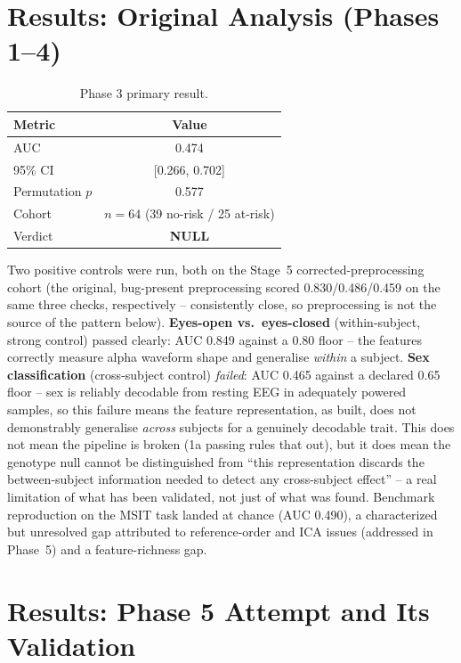 \documentclass[11pt]{article}
\begin{document}
\section{Results: Original Analysis (Phases 1--4)}

\begin{table}[h]
\centering
\caption{Phase 3 primary result.}
\begin{tabular}{lc}
\toprule
Metric & Value \\
\midrule
AUC & 0.474 \\
95\% CI & [0.266, 0.702] \\
Permutation $p$ & 0.577 \\
Cohort & $n=64$ (39 no-risk / 25 at-risk) \\
Verdict & \textbf{NULL} \\
\bottomrule
\end{tabular}
\end{table}

Two positive controls were run, both on the Stage~5 corrected-preprocessing
cohort (the original, bug-present preprocessing scored 0.830/0.486/0.459 on
the same three checks, respectively -- consistently close, so preprocessing
is not the source of the pattern below). \textbf{Eyes-open vs.\
eyes-closed} (within-subject, strong control) passed clearly: AUC 0.849
against a 0.80 floor -- the features correctly measure alpha waveform
shape and generalise \emph{within} a subject. \textbf{Sex classification}
(cross-subject control) \emph{failed}: AUC 0.465 against a declared 0.65
floor -- sex is reliably decodable from resting EEG in adequately powered
samples, so this failure means the feature representation, as built, does
not demonstrably generalise \emph{across} subjects for a genuinely
decodable trait. This does not mean the pipeline is broken (1a passing
rules that out), but it does mean the genotype null cannot be
distinguished from ``this representation discards the between-subject
information needed to detect any cross-subject effect'' -- a real
limitation of what has been validated, not just of what was found.
Benchmark reproduction on the MSIT task landed at chance (AUC 0.490), a
characterized but unresolved gap attributed to reference-order and ICA
issues (addressed in Phase~5) and a feature-richness gap.

\section{Results: Phase 5 Attempt and Its Validation}
\end{document}
